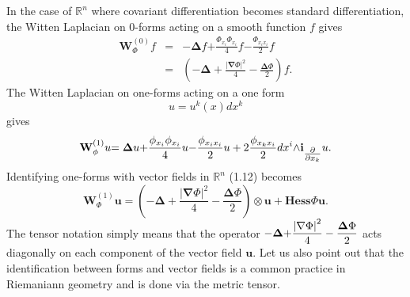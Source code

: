 \documentclass{article}
\begin{document}
In the case of $\mathbb{R}^{n}$ where covariant differentiation becomes
standard differentiation, the Witten Laplacian on 0-forms acting on a smooth
function $f$ gives%
\begin{eqnarray}
\mathbf{W}_{\Phi }^{(0)}f &\mathbf{=}&\mathbf{-\Delta }f\mathbf{+}\frac{\Phi
_{x_{i}}\Phi _{x_{i}}}{4}f\mathbf{-}\frac{\Phi _{x_{i}x_{i}}}{2}f \\
&=&\left( \mathbf{-\Delta +}\frac{\left| \mathbf{\nabla }\Phi \right| ^{2}}{4%
}-\frac{\mathbf{\Delta }\Phi }{2}\right) f.
\end{eqnarray}%
\newline
The Witten Laplacian on one-forms acting on a one form 
\begin{equation*}
u=u^{k}(x)dx^{k}
\end{equation*}%
gives%
\begin{equation}
\mathbf{W}_{\phi }^{\left( 1\right) }u\mathbf{=\Delta }u\mathbf{+}\frac{%
\mathbf{\phi }_{x_{i}}\mathbf{\phi }_{x_{i}}}{4}u\mathbf{-}\frac{\mathbf{%
\phi }_{x_{i}x_{i}}}{2}u+2\frac{\mathbf{\phi }_{x_{k}x_{i}}}{2}dx^{i}\mathbf{%
\wedge i}_{\tfrac{\partial }{\partial x_{k}}}u.
\end{equation}%
Identifying one-forms with vector fields in $\mathbb{R}^{n}$ (1.12) becomes 
\begin{equation}
\mathbf{W}_{\Phi }^{\left( 1\right) }\mathbf{u=}\left( \mathbf{-\Delta +}%
\frac{\left| \mathbf{\nabla }\Phi \right| ^{2}}{4}-\frac{\mathbf{\Delta }%
\Phi }{2}\right) \otimes \mathbf{u}+\mathbf{Hess}\Phi \mathbf{u}.
\end{equation}%
The tensor notation simply means that the operator $\mathbf{-\Delta +}\dfrac{%
\left| \mathbf{\nabla }\Phi \right| ^{2}}{4}-\dfrac{\mathbf{\Delta }\Phi }{2}
$ acts diagonally on each component of the vector field $\mathbf{u.}$ Let us
also point out that the identification between forms and vector fields is a
common practice in Riemaniann geometry and is done via the metric tensor.
\end{document}
